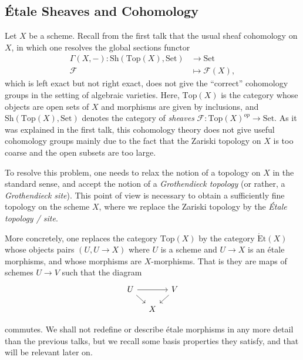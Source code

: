 \documentclass{article}
\newcommand{\Top}{\mathrm{Top}}
\newcommand{\Set}{\mathrm{Set}}
\newcommand{\Et}{\acute{\mathrm{E}}\mathrm{t}}
\theoremstyle{plain}
\theoremstyle{definition}
\begin{document}
    \subsection{\'{E}tale Sheaves and Cohomology}\label{sec:recap}
    Let $X$ be a scheme. Recall from the first talk that the usual sheaf cohomology on $X$, in which one resolves the global sections functor
    \begin{align*}
        \Gamma(X,-):\mathrm{Sh}(\Top(X),\Set)&\longrightarrow\Set\\
        \mathcal{F}&\longmapsto\mathcal{F}(X),    
    \end{align*} 
    which is left exact but not right exact, does not give the ``correct'' cohomology groups in the setting of algebraic varieties.  Here, $\Top(X)$ is the category whose objects are open sets of $X$ and morphisms are given by inclusions, and $\mathrm{Sh}(\Top(X),\Set)$ denotes the category of \textit{sheaves} $\mathcal{F}:\Top(X)^{op}\to\Set$. As it was explained in the first talk, this cohomology theory does not give useful cohomology groups mainly due to the fact that the Zariski topology on $X$ is too coarse and the open subsets are too large.

    To resolve this problem, one needs to relax the notion of a topology on $X$ in the standard sense, and accept the notion of a \textit{Grothendieck topology} (or rather, a \textit{Grothendieck site}). This point of view is necessary to obtain a sufficiently fine topology on the scheme $X$, where we replace the Zariski topology by the \textit{\'{E}tale topology / site}. 
    
    More concretely, one replaces the category $\Top(X)$ by the category $\Et(X)$ whose objects pairs $(U,U\to X)$ where $U$ is a scheme and $U\to X$ is an \'{e}tale morphisms, and whose morphisms are $X$-morphisms. That is they are maps of schemes $U\to V$ such that the diagram 
    \[
        \begin{tikzcd}[row sep=1em, column sep=1em]
			U \arrow[rr, ""] \arrow[dr, ""]  & & V \arrow[dl, ""] \\
			& X &
		\end{tikzcd}
    \]
    
    commutes. We shall not redefine or describe \'{e}tale morphisms in any more detail than the previous talks, but we recall some basis properties they satisfy, and that will be relevant later on.
    
\end{document}

